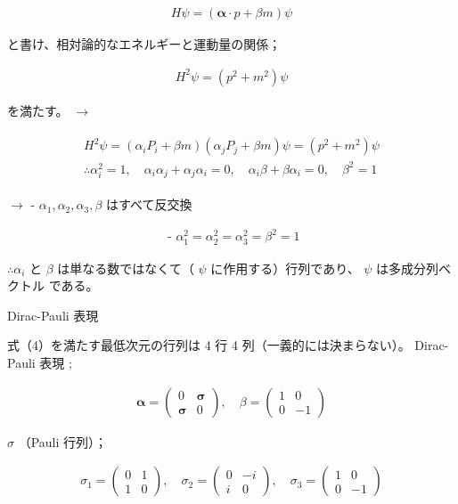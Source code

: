 \documentclass[titlepage]{ltjsarticle}
\begin{document}
\begin{align*}
H \psi=(\boldsymbol{\alpha} \cdot p+\beta m) \psi
\end{align*}


と書け、相対論的なエネルギーと運動量の関係；

\begin{align*}
H^2 \psi=\left(p^2+m^2\right) \psi
\end{align*}


を満たす。
\(\rightarrow\)

\begin{align*}
\begin{gathered}
H^2 \psi=\left(\alpha_i P_i+\beta m\right)\left(\alpha_j P_j+\beta m\right) \psi=\left(p^2+m^2\right) \psi \\
\therefore \alpha_i^2=1, \quad \alpha_i \alpha_j+\alpha_j \alpha_i=0, \quad \alpha_i \beta+\beta \alpha_i=0, \quad \beta^2=1
\end{gathered}
\end{align*}

\(\rightarrow\)
- \(\alpha_1, \alpha_2, \alpha_3, \beta\) はすべて反交換

\begin{align*}
\text { - } \alpha_1^2=\alpha_2^2=\alpha_3^2=\beta^2=1
\end{align*}

\(\therefore \alpha_i\) と \(\beta\) は単なる数ではなくて（ \(\psi\) に作用する）行列であり、 \(\psi\) は多成分列ベクトル である。


Dirac-Pauli 表現

式（4）を満たす最低次元の行列は 4 行 4 列（一義的には決まらない）。
Dirac-Pauli 表現 ;

\begin{align*}
\boldsymbol{\alpha}=\left(\begin{array}{cc}
0 & \boldsymbol{\sigma} \\
\boldsymbol{\sigma} & 0
\end{array}\right), \quad \beta=\left(\begin{array}{cc}
1 & 0 \\
0 & -1
\end{array}\right)
\end{align*}

\(\sigma\) （Pauli 行列）；

\begin{align*}
\sigma_1=\left(\begin{array}{ll}
0 & 1 \\
1 & 0
\end{array}\right), \quad \sigma_2=\left(\begin{array}{cc}
0 & -i \\
i & 0
\end{array}\right), \quad \sigma_3=\left(\begin{array}{cc}
1 & 0 \\
0 & -1
\end{array}\right)
\end{align*}
\end{document}
